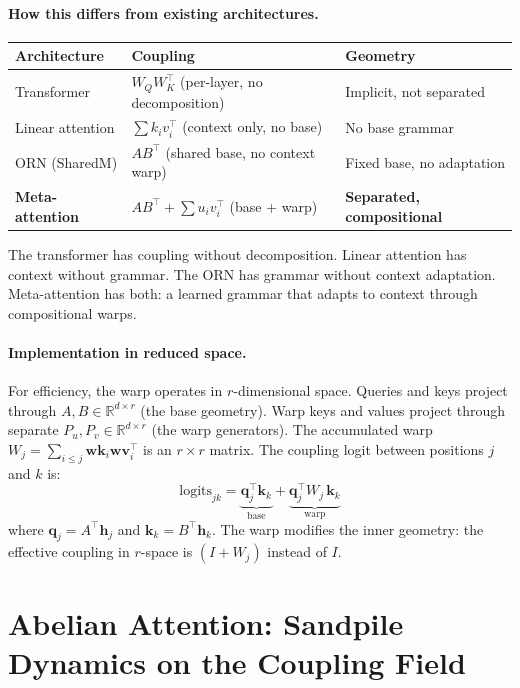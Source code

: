 \documentclass[11pt, a4paper]{article}
\newcommand{\h}{\mathbf{h}}
\newcommand{\R}{\mathbb{R}}
\theoremstyle{plain}
\theoremstyle{definition}
\theoremstyle{remark}
\begin{document}
\paragraph{How this differs from existing architectures.}
\begin{center}\small
\begin{tabular}{lll}
\toprule
\textbf{Architecture} & \textbf{Coupling} & \textbf{Geometry} \\
\midrule
Transformer & $W_Q W_K^\top$ (per-layer, no decomposition) & Implicit, not separated \\
Linear attention & $\sum k_i v_i^\top$ (context only, no base) & No base grammar \\
ORN (SharedM) & $AB^\top$ (shared base, no context warp) & Fixed base, no adaptation \\
\textbf{Meta-attention} & $AB^\top + \sum u_i v_i^\top$ (base + warp) & \textbf{Separated, compositional} \\
\bottomrule
\end{tabular}
\end{center}

The transformer has coupling without decomposition.
Linear attention has context without grammar.
The ORN has grammar without context adaptation.
Meta-attention has both: a learned grammar that adapts to context through compositional warps.

\paragraph{Implementation in reduced space.}
For efficiency, the warp operates in $r$-dimensional space.
Queries and keys project through $A, B \in \R^{d \times r}$ (the base geometry).
Warp keys and values project through separate $P_u, P_v \in \R^{d \times r}$ (the warp generators).
The accumulated warp $W_j = \sum_{i \leq j} \mathbf{wk}_i \mathbf{wv}_i^\top$ is an $r \times r$ matrix.
The coupling logit between positions $j$ and $k$ is:
\begin{equation}
\mathrm{logits}_{jk} = \underbrace{\mathbf{q}_j^\top \mathbf{k}_k}_{\text{base}} + \underbrace{\mathbf{q}_j^\top W_j \, \mathbf{k}_k}_{\text{warp}}
\end{equation}
where $\mathbf{q}_j = A^\top \h_j$ and $\mathbf{k}_k = B^\top \h_k$.
The warp modifies the inner geometry: the effective coupling in $r$-space is $(I + W_j)$ instead of $I$.


\section{Abelian Attention: Sandpile Dynamics on the Coupling Field}
\label{sec:abelian}
\end{document}
